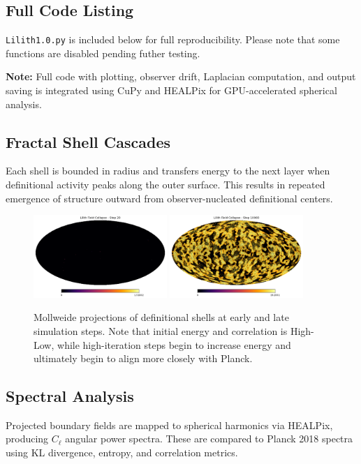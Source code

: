 \subsection{Full Code Listing}
\texttt{Lilith1.0.py} is included below for full reproducibility. Please note that some functions are disabled pending futher testing. 






\textbf{Note:} Full code with plotting, observer drift, Laplacian computation, and output saving is integrated using CuPy and HEALPix for GPU-accelerated spherical analysis.

\subsection{Fractal Shell Cascades}
Each shell is bounded in radius and transfers energy to the next layer when definitional activity peaks along the outer surface. This results in repeated emergence of structure outward from observer-nucleated definitional centers.
\begin{figure}[ht]
  \centering
  \includegraphics[width=0.45\textwidth]{images/mollweide_000020.png}
  \includegraphics[width=0.45\textwidth]{images/mollweide_010000.png}
  \caption{Mollweide projections of definitional shells at early and late simulation steps. Note that initial energy and correlation is High-Low, while high-iteration steps begin to increase energy and ultimately begin to align more closely with Planck.}
\end{figure}

\subsection{Spectral Analysis}
Projected boundary fields are mapped to spherical harmonics via HEALPix, producing $C_\ell$ angular power spectra. These are compared to Planck 2018 spectra using KL divergence, entropy, and correlation metrics.

